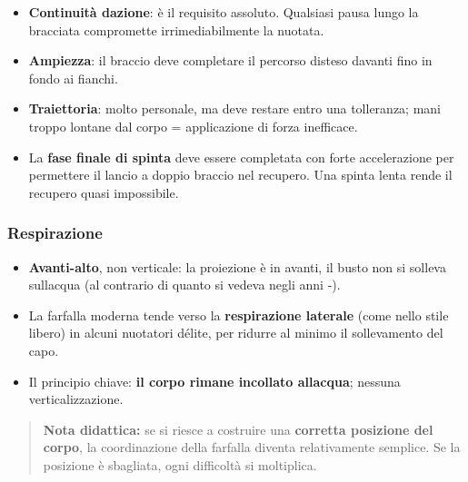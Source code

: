 \documentclass[a4paper,11pt]{article}
\providecommand{\tightlist}{%
  \setlength{\itemsep}{0pt}\setlength{\parskip}{0pt}}
\begin{document}
\begin{itemize}
      \tightlist
      \item
            \textbf{Continuità d\textquotesingle azione}: è il requisito assoluto.
            Qualsiasi pausa lungo la bracciata compromette irrimediabilmente la
            nuotata.
      \item
            \textbf{Ampiezza}: il braccio deve completare il percorso disteso
            davanti fino in fondo ai fianchi.
      \item
            \textbf{Traiettoria}: molto personale, ma deve restare entro una
            tolleranza; mani troppo lontane dal corpo = applicazione di forza
            inefficace.
      \item
            La \textbf{fase finale di spinta} deve essere completata con forte
            accelerazione per permettere il lancio a doppio braccio nel recupero.
            Una spinta lenta rende il recupero quasi impossibile.
\end{itemize}

\subsubsection{Respirazione}\label{respirazione-3}

\begin{itemize}
      \tightlist
      \item
            \textbf{Avanti-alto}, non verticale: la proiezione è in avanti, il
            busto non si solleva sull\textquotesingle acqua (al contrario di
            quanto si vedeva negli anni -).
      \item
            La farfalla moderna tende verso la \textbf{respirazione laterale}
            (come nello stile libero) in alcuni nuotatori d\textquotesingle élite,
            per ridurre al minimo il sollevamento del capo.
      \item
            Il principio chiave: \textbf{il corpo rimane incollato
                  all\textquotesingle acqua}; nessuna verticalizzazione.
\end{itemize}

\begin{quote}
      \textbf{Nota didattica:} se si riesce a costruire una \textbf{corretta
            posizione del corpo}, la coordinazione della farfalla diventa
      relativamente semplice. Se la posizione è sbagliata, ogni difficoltà si
      moltiplica.
\end{quote}
\end{document}
